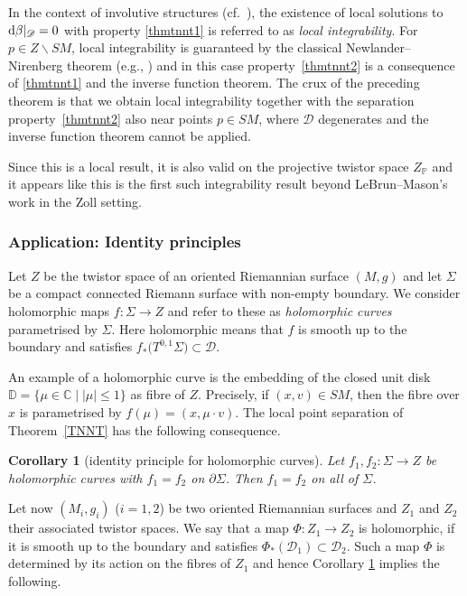 \documentclass[10pt,a4paper]{amsart}
\numberwithin{equation}{section}
\newtheorem{Corollary}[Theorem]{Corollary}
\theoremstyle{definition}
\newcommand{\C}{\mathbb{C}} %
\newcommand{\DD}{\mathbb{D}} %
\newcommand{\1}{{\bf 1}}
\newcommand{\D}{\mathscr{D}}
\begin{document}
In the context of involutive structures (cf.~\cite{Tre92}), the existence of local solutions to ${\rm d}\beta|_{\D} = 0$ with property \ref{thmtnnt1} is referred to as {\it local integrability}. For $p\in Z\backslash SM$, local integrability is guaranteed by the classical Newlander--Nirenberg theorem (e.g., \cite[Theorem~2.6.19]{Huy05}) and in this case property~\ref{thmtnnt2} is a consequence of \ref{thmtnnt1} and the inverse function theorem. The crux of the preceding theorem is that we obtain local integrability together with the separation property~\ref{thmtnnt2} also near points $p\in SM$, where $\D$ degenerates and the inverse function theorem cannot be applied.

 Since this is a local result, it is also valid on the projective twistor space $Z_\mathbb P$ and it appears like this is the first such integrability result beyond LeBrun--Mason's work in the Zoll setting.

\subsubsection{Application: Identity principles} Let $Z$ be the twistor space of an oriented Riemannian surface $(M,g)$ and let $\Sigma$ be a compact connected Riemann surface with non-empty boundary. We consider holomorphic maps
${f\colon \Sigma\rightarrow Z}$
and refer to these as {\it holomorphic curves} parametrised by $\Sigma$. Here holomorphic means that $f$ is smooth up to the boundary and satisfies $f_*\bigl(T^{0,1}\Sigma\bigr)\subset \mathscr D$.

An example of a holomorphic curve is the embedding of the closed unit disk $\DD=\{\mu\in \C\mid |\mu|\le 1\}$ as fibre of $Z$. Precisely, if $(x,v)\in SM$, then the fibre over $x$ is parametrised by $f(\mu)=(x,\mu\cdot v)$. The local point separation of Theorem~\ref{TNNT} has the following consequence.

\begin{Corollary}[identity principle for holomorphic curves]\label{cor_curves}
Let $f_1,f_2\colon \Sigma\rightarrow Z$ be holomorphic curves with $f_1=f_2$ on $\partial \Sigma$. Then $f_1=f_2$ on all of $\Sigma$.
\end{Corollary}

Let now $(M_i,g_i)$ ($i=1,2$) be two oriented Riemannian surfaces and $Z_1$ and $Z_2$ their associated twistor spaces. We say that a map $\Phi\colon Z_1\rightarrow Z_2$ is holomorphic, if it is smooth up to the boundary and satisfies $\Phi_*(\mathscr D_1)\subset \mathscr{D}_2$. Such a map $\Phi$ is determined by its action on the fibres of $Z_1$ and hence Corollary \ref{cor_curves} implies the following.
\end{document}

